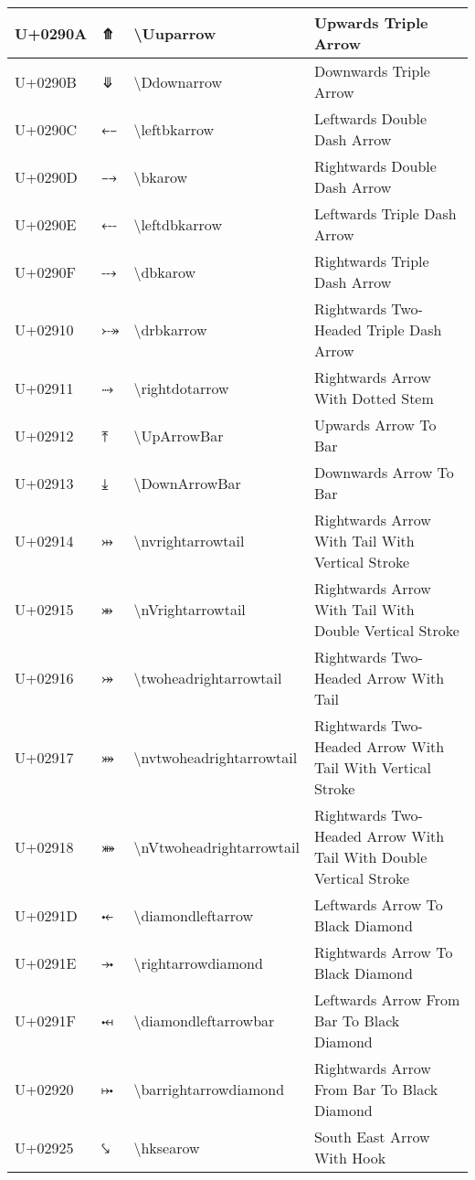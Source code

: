 \begin{table}[h]
\begin{tabulary}{\linewidth}{|L|L|L|L|}
\hline
U+0290A & ⤊ & {\textbackslash}Uuparrow & Upwards Triple Arrow \\
\hline
U+0290B & ⤋ & {\textbackslash}Ddownarrow & Downwards Triple Arrow \\
\hline
U+0290C & ⤌ & {\textbackslash}leftbkarrow & Leftwards Double Dash Arrow \\
\hline
U+0290D & ⤍ & {\textbackslash}bkarow & Rightwards Double Dash Arrow \\
\hline
U+0290E & ⤎ & {\textbackslash}leftdbkarrow & Leftwards Triple Dash Arrow \\
\hline
U+0290F & ⤏ & {\textbackslash}dbkarow & Rightwards Triple Dash Arrow \\
\hline
U+02910 & ⤐ & {\textbackslash}drbkarrow & Rightwards Two-Headed Triple Dash Arrow \\
\hline
U+02911 & ⤑ & {\textbackslash}rightdotarrow & Rightwards Arrow With Dotted Stem \\
\hline
U+02912 & ⤒ & {\textbackslash}UpArrowBar & Upwards Arrow To Bar \\
\hline
U+02913 & ⤓ & {\textbackslash}DownArrowBar & Downwards Arrow To Bar \\
\hline
U+02914 & ⤔ & {\textbackslash}nvrightarrowtail & Rightwards Arrow With Tail With Vertical Stroke \\
\hline
U+02915 & ⤕ & {\textbackslash}nVrightarrowtail & Rightwards Arrow With Tail With Double Vertical Stroke \\
\hline
U+02916 & ⤖ & {\textbackslash}twoheadrightarrowtail & Rightwards Two-Headed Arrow With Tail \\
\hline
U+02917 & ⤗ & {\textbackslash}nvtwoheadrightarrowtail & Rightwards Two-Headed Arrow With Tail With Vertical Stroke \\
\hline
U+02918 & ⤘ & {\textbackslash}nVtwoheadrightarrowtail & Rightwards Two-Headed Arrow With Tail With Double Vertical Stroke \\
\hline
U+0291D & ⤝ & {\textbackslash}diamondleftarrow & Leftwards Arrow To Black Diamond \\
\hline
U+0291E & ⤞ & {\textbackslash}rightarrowdiamond & Rightwards Arrow To Black Diamond \\
\hline
U+0291F & ⤟ & {\textbackslash}diamondleftarrowbar & Leftwards Arrow From Bar To Black Diamond \\
\hline
U+02920 & ⤠ & {\textbackslash}barrightarrowdiamond & Rightwards Arrow From Bar To Black Diamond \\
\hline
U+02925 & ⤥ & {\textbackslash}hksearow & South East Arrow With Hook \\

\end{tabulary}
\end{table}

